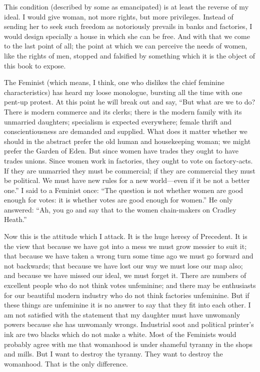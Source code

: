 \documentclass{book}
\begin{document}
This condition (described by some as emancipated) is at least the reverse of my ideal. I would give woman, not more rights, but more privileges. Instead of sending her to seek such freedom as notoriously prevails in banks and factories, I would design specially a house in which she can be free. And with that we come to the last point of all; the point at which we can perceive the needs of women, like the rights of men, stopped and falsified by something which it is the object of this book to expose.

The Feminist (which means, I think, one who dislikes the chief feminine characteristics) has heard my loose monologue, bursting all the time with one pent-up protest. At this point he will break out and say, “But what are we to do? There is modern commerce and its clerks; there is the modern family with its unmarried daughters; specialism is expected everywhere; female thrift and conscientiousness are demanded and supplied. What does it matter whether we should in the abstract prefer the old human and housekeeping woman; we might prefer the Garden of Eden. But since women have trades they ought to have trades unions. Since women work in factories, they ought to vote on factory-acts. If they are unmarried they must be commercial; if they are commercial they must be political. We must have new rules for a new world—even if it be not a better one.” I said to a Feminist once: “The question is not whether women are good enough for votes: it is whether votes are good enough for women.” He only answered: “Ah, you go and say that to the women chain-makers on Cradley Heath.”

Now this is the attitude which I attack. It is the huge heresy of Precedent. It is the view that because we have got into a mess we must grow messier to suit it; that because we have taken a wrong turn some time ago we must go forward and not backwards; that because we have lost our way we must lose our map also; and because we have missed our ideal, we must forget it. There are numbers of excellent people who do not think votes unfeminine; and there may be enthusiasts for our beautiful modern industry who do not think factories unfeminine. But if these things are unfeminine it is no answer to say that they fit into each other. I am not satisfied with the statement that my daughter must have unwomanly powers because she has unwomanly wrongs. Industrial soot and political printer’s ink are two blacks which do not make a white. Most of the Feminists would probably agree with me that womanhood is under shameful tyranny in the shops and mills. But I want to destroy the tyranny. They want to destroy the womanhood. That is the only difference.
\end{document}
